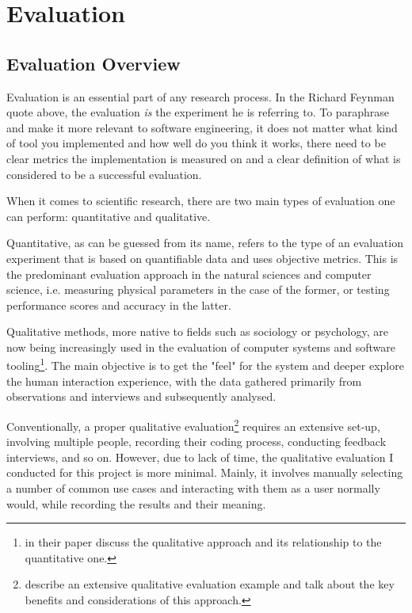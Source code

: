 \documentclass[sigplan,screen]{acmart}
\begin{document}
\section{Evaluation}
\subsection{Evaluation Overview}
Evaluation is an essential part of any research process. In the Richard Feynman quote above, the evaluation \textit{is} the experiment he is referring to. To paraphrase and make it more relevant to software engineering, it does not matter what kind of tool you implemented and how well do you think it works, there need to be clear metrics the implementation is measured on and a clear definition of what is considered to be a successful evaluation.

When it comes to scientific research, there are two main types of evaluation one can perform: quantitative and qualitative.

Quantitative, as can be guessed from its name, refers to the type of an evaluation experiment that is based on quantifiable data and uses objective metrics. This is the predominant evaluation approach in the natural sciences and computer science, i.e. measuring physical parameters in the case of the former, or testing performance scores and accuracy in the latter.

Qualitative methods, more native to fields such as sociology or psychology, are now being increasingly used in the evaluation of computer systems and software tooling\footnote{\cite{Hazz06a} in their paper discuss the qualitative approach and its relationship to the quantitative one.}. The main objective is to get the "feel" for the system and deeper explore the human interaction experience, with the data gathered primarily from observations and interviews and subsequently analysed.

Conventionally, a proper qualitative evaluation\footnote{\cite{Kapl05a} describe an extensive qualitative evaluation example and talk about the key benefits and considerations of this approach.} requires an extensive set-up, involving multiple people, recording their coding process, conducting feedback interviews, and so on. However, due to lack of time, the qualitative evaluation I conducted for this project is more minimal. Mainly, it involves manually selecting a number of common use cases and interacting with them as a user normally would, while recording the results and their meaning.
\end{document}

